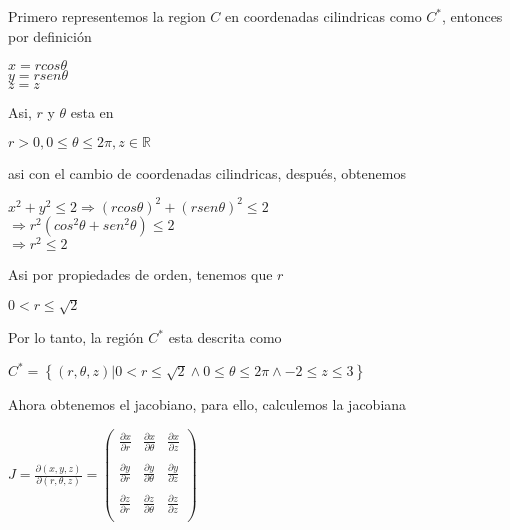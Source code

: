 Primero representemos la region $C$ en coordenadas cilindricas como $C^*$, entonces por definición\begin{center}
    $x = rcos\theta$\\
    \vspace{0.3cm}
    $y = rsen\theta$\\
    \vspace{0.3cm}
    $z = z$
\end{center}Asi, $r$ y $\theta$ esta en\begin{center}
    $r > 0, 0\leq \theta\leq 2\pi, z\in\mathbb{R}$
\end{center}asi con el cambio de coordenadas cilindricas, después, obtenemos\begin{center}
    $x^2+y^2\leq 2\Rightarrow  \left ( rcos\theta \right )^2+ \left ( rsen\theta \right )^2\leq2$\\
    \vspace{0.3cm}
    $\Rightarrow r^2 \left ( cos^2\theta + sen^2\theta \right )\leq 2$\\
    \vspace{0.3cm}
    $\Rightarrow r^2 \leq 2$
\end{center}Asi por propiedades de orden, tenemos que $r$\begin{center}
    $0<r\leq\sqrt{2}$
\end{center}Por lo tanto, la región $C^*$ esta descrita como\begin{center}
    $C^* = \left\{ (r,\theta,z) | 0<r\leq\sqrt{2} \wedge 0\leq\theta\leq 2\pi \wedge -2\leq z\leq 3 \right\}$
\end{center}Ahora obtenemos el jacobiano, para ello, calculemos la jacobiana\begin{center}
    $J = \displaystyle\frac{\partial(x, y, z)}{\partial(r, \theta, z)} = 
        \begin{pmatrix}
            \displaystyle\frac{\partial x}{\partial r} & \displaystyle\frac{\partial x}{\partial \theta} & \displaystyle\frac{\partial x}{\partial z} \\\\
           \displaystyle \frac{\partial y}{\partial r} & \displaystyle\frac{\partial y}{\partial \theta} & \displaystyle\frac{\partial y}{\partial z} \\\\
            \displaystyle\frac{\partial z}{\partial r} & \displaystyle\frac{\partial z}{\partial \theta} & \displaystyle\frac{\partial z}{\partial z} \\
        \end{pmatrix}$

\end{center}
